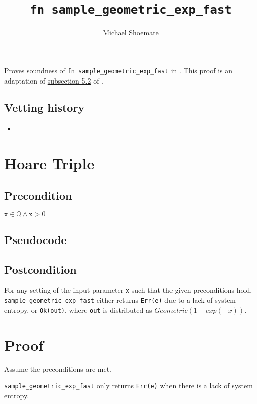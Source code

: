 \documentclass{article}
\title{\texttt{fn sample\_geometric\_exp\_fast}}
\author{Michael Shoemate}
\begin{document}
\maketitle

\contrib
Proves soundness of \texttt{fn sample\_geometric\_exp\_fast} in .
This proof is an adaptation of \href{https://arxiv.org/pdf/2004.00010.pdf#subsection.5.2}{subsection 5.2} of \cite{CKS20}.

\subsection*{Vetting history}
\begin{itemize}
    \item {}
\end{itemize}

\section{Hoare Triple}
\subsection*{Precondition}
$\texttt{x} \in \mathbb{Q} \land \texttt{x} > 0$

\subsection*{Pseudocode}        


\subsection*{Postcondition}
\label{postcondition}
For any setting of the input parameter \texttt{x} such that the given preconditions hold, \\
\texttt{sample\_geometric\_exp\_fast} either returns \texttt{Err(e)} due to a lack of system entropy,
or \texttt{Ok(out)}, where \texttt{out} is distributed as $Geometric(1 - exp(-x))$.

\section{Proof}
Assume the preconditions are met.

\begin{lemma}\label{err-e}
    \texttt{sample\_geometric\_exp\_fast} only returns \texttt{Err(e)} when there is a lack of system entropy.
\end{lemma}
\end{document}
